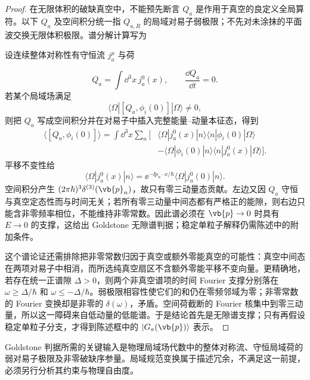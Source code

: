 \begin{proof}
在无限体积的破缺真空中，不能预先断言 $Q_a$ 是作用于真空的良定义全局算符。以下 $Q_a$ 及空间积分统一指 $Q_{a,R}$ 的局域对易子弱极限；不先对未涂抹的平面波交换无限体积极限。谱分解计算写为

设连续整体对称性有守恒流 \(j_a^\mu\) 与荷

\begin{equation*}
 Q_a=\int\dd^3 x\,j_a^0(x),
 \qquad
 \frac{\dd Q_a}{\dd t}=0.
\end{equation*}
若某个局域场满足
\begin{equation*}
 \langle\Omega|[Q_a,\phi_i(0)]|\Omega\rangle\neq0,
\end{equation*}
则把 \(Q_a\) 写成空间积分并在对易子中插入完整能量--动量本征态，得到
\begin{align*}
 \langle[Q_a,\phi_i(0)]\rangle
 =\int\dd^3 x\sum_n
 \bigl[&\langle\Omega|j_a^0(x)|n\rangle
 \langle n|\phi_i(0)|\Omega\rangle\\
 &-\langle\Omega|\phi_i(0)|n\rangle
 \langle n|j_a^0(x)|\Omega\rangle\bigr].
\end{align*}
平移不变性给
\begin{equation*}
 \langle\Omega|j_a^0(x)|n\rangle
 =\ee^{-\ii p_n\cdot x/\hbar}
 \langle\Omega|j_a^0(0)|n\rangle.
\end{equation*}
空间积分产生 \((2\pi\hbar)^3\delta^{(3)}(\vb{p}_n)\)，故只有零三动量态贡献。左边又因 \(Q_a\) 守恒与真空定态性而与时间无关；若所有零三动量中间态都有严格正的能隙，则右边只能含非零频率相位，不能维持非零常数。因此谱必须在 \(\vb{p}\to0\) 时具有 \(E\to0\) 的支撑，这给出 Goldstone 无隙谱判据；稳定单粒子解释仍需陈述中的附加条件。

这个谱论证还需排除把非零常数归因于真空或额外零能真空的可能性：真空中间态在两项对易子中相消，而所选纯真空扇区不含额外零能平移不变向量。更精确地，若存在统一正谱隙 $\Delta>0$，则两个非真空谱项的时间 Fourier 支撑分别落在 $\omega\ge\Delta/\hbar$ 和 $\omega\le-\Delta/\hbar$。弱极限相容性使它们的和仍在零频邻域为零；非零常数的 Fourier 变换却是非零的 $\delta(\omega)$，矛盾。空间荷截断的 Fourier 核集中到零三动量，所以这一障碍来自低动量的低能谱。于是结论首先是无隙谱支撑；只有再假设稳定单粒子分支，才得到陈述框中的 $|G_a(\vb{p})\rangle$ 表示。

\end{proof}
Goldstone 判据所需的关键输入是物理局域场代数中的整体对称流、守恒局域荷的弱对易子极限及非零破缺序参量。局域规范变换属于描述冗余，不满足这一前提，必须另行分析其约束与物理自由度。

